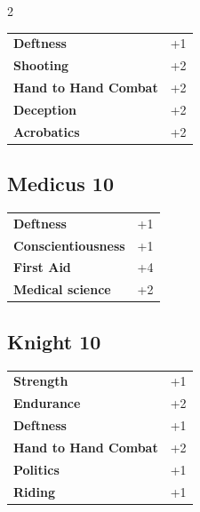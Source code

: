 \begin{multicols}{2}
\begin{tcolorbox}
\begin{tabular}{@{}ll@{}}
    \textbf{Deftness} & +1\\
    \textbf{Shooting} & +2\\
    \textbf{Hand to Hand Combat} & +2\\
    \textbf{Deception} & +2\\
    \textbf{Acrobatics} & +2\\
\end{tabular}


\end{tcolorbox}

\begin{tcolorbox}
    \subsection*{Medicus \hfill \small{10 }}
    \tcblower




\begin{tabular}{@{}ll@{}}
    \textbf{Deftness} & +1\\
    \textbf{Conscientiousness} & +1\\
    \textbf{First Aid} & +4\\
    \textbf{Medical science} & +2\\
\end{tabular}


\end{tcolorbox}

\begin{tcolorbox}
    \subsection*{Knight \hfill \small{10 }}
    \tcblower




\begin{tabular}{@{}ll@{}}
    \textbf{Strength} & +1\\
    \textbf{Endurance} & +2\\
    \textbf{Deftness} & +1\\
    \textbf{Hand to Hand Combat} & +2\\
    \textbf{Politics} & +1\\
    \textbf{Riding} & +1\\
\end{tabular}


\end{tcolorbox}
\end{multicols}
